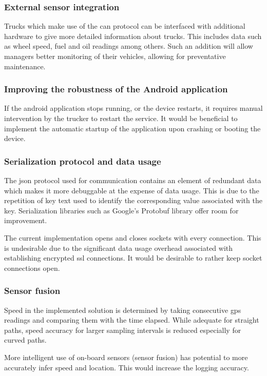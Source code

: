 \subsubsection{External sensor integration}
Trucks which make use of the \ac{can} protocol can be interfaced with additional hardware to give more detailed information about trucks.
This includes data such as wheel speed, fuel and oil readings among others.
Such an addition will allow managers better monitoring of their vehicles, allowing for preventative maintenance.

\subsubsection{Improving the robustness of the Android application}
If the android application stops running, or the device restarts, it requires manual intervention by the trucker to restart the service.
It would be beneficial to implement the automatic startup of the application upon crashing or booting the device.

\subsubsection{Serialization protocol and data usage}
The \ac{json} protocol used for communication contains an element of redundant data which makes it more debuggable at the expense of data usage.
This is due to the repetition of key text used to identify the corresponding value associated with the key.
Serialization libraries such as Google's Protobuf library offer room for improvement.

The current implementation opens and closes sockets with every connection.
This is undesirable due to the significant data usage overhead associated with establishing encrypted \ac{ssl} connections.
It would be desirable to rather keep socket connections open.

\subsubsection{Sensor fusion}
Speed in the implemented solution is determined by taking consecutive \ac{gps} readings and comparing them with the time elapsed.
While adequate for straight paths, speed accuracy for larger sampling intervals is reduced especially for curved paths.

More intelligent use of on-board sensors (sensor fusion) has potential to more accurately infer speed and location.
This would increase the logging accuracy.

